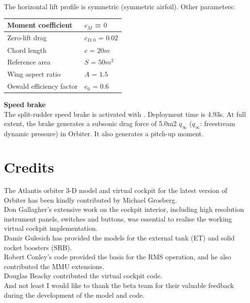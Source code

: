 The horizontal lift profile is symmetric (symmetric airfoil). Other parameters:

\begin{table}[H]
\centering
\begin{tabular}{|l|l|}
\hline
Moment coefficient & $c_M$ = $0$ \\ \hline
Zero-lift drag & $c_{D,0}$ = $0.02$ \\ \hline
Chord length & $c$ = $20 m$ \\ \hline
Reference area & $S$ = $50 m^2$ \\ \hline
Wing aspect ratio & $A$ = $1.5$ \\ \hline
Oswald efficiency factor & $e_0$ = $0.6$ \\ \hline
\end{tabular}
\end{table}

\textbf{\large Speed brake}\\

The split-rudder speed brake is activated with . Deployment time is 4.93s. At full extent, the brake generates a subsonic drag force of 5.0m2 $q_\infty$ ($q_\infty$: freestream dynamic pressure) in Orbiter. It also generates a pitch-up moment.

\newpage
\section{Credits}
The Atlantis orbiter 3-D model and virtual cockpit for the latest version of Orbiter has been kindly contributed by Michael Grosberg.\\

Don Gallagher’s extensive work on the cockpit interior, including high resolution instrument panels, switches and buttons, was essential to realise the working virtual cockpit implementation.\\

Damir Gulesich has provided the models for the external tank (ET) and solid rocket boosters (SRB).\\

Robert Conley’s code provided the basis for the RMS operation, and he also contributed the MMU extensions.\\

Douglas Beachy contributed the virtual cockpit code.\\

And not least I would like to thank the beta team for their valuable feedback during the development of the model and code.

